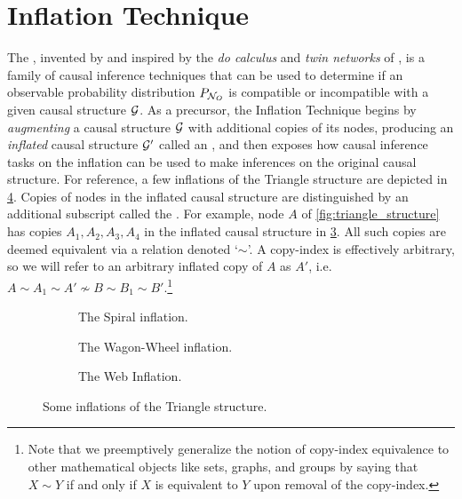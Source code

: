 \documentclass[aps, 10pt, english, twoside, pra, nofootinbib, tightenlines, longbibliography, superscriptaddress]{revtex4-1}
\begin{document}
    \section{Inflation Technique}
    \label{sec:inflation_technique_summary}
    The , invented by \citet{Inflation} and inspired by the \textit{do calculus} and \textit{twin networks} of \citet{Pearl_2009}, is a family of causal inference techniques that can be used to determine if an observable probability distribution $\prob[\nodes_{O}]$ is compatible or incompatible with a given causal structure $\mathcal{G}$. As a precursor, the Inflation Technique begins by \textit{augmenting} a causal structure $\mathcal{G}$ with additional copies of its nodes, producing an \textit{inflated} causal structure $\mathcal{G}'$ called an , and then exposes how causal inference tasks on the inflation can be used to make inferences on the original causal structure. For reference, a few inflations of the Triangle structure are depicted in \cref{fig:inflations}. Copies of nodes in the inflated causal structure are distinguished by an additional subscript called the . For example, node $A$ of \cref{fig:triangle_structure} has copies $A_1, A_2, A_3, A_4$ in the inflated causal structure in \cref{fig:the_web_inflation}. All such copies are deemed equivalent via a  relation denoted `$\sim$'. A copy-index is effectively arbitrary, so we will refer to an arbitrary inflated copy of $A$ as $A'$, i.e. $A \sim A_1 \sim A' \not\sim B \sim B_1 \sim B'$.\footnote{Note that we preemptively generalize the notion of copy-index equivalence to other mathematical objects like sets, graphs, and groups by saying that $X \sim Y$ if and only if $X$ is equivalent to $Y$ upon removal of the copy-index.}

    \begin{nscenter}
    \begin{figure}
    \begin{subfigure}[b]{.30\linewidth}
    \scalebox{0.65}{}
    \caption{The Spiral inflation.}\label{fig:spiral_inflation}
    \end{subfigure}
    \begin{subfigure}[b]{.30\linewidth}
    \scalebox{0.65}{}
    \caption{The Wagon-Wheel inflation.}\label{fig:wagon_wheel_inflation}
    \end{subfigure}
    \begin{subfigure}[b]{.30\linewidth}
    \scalebox{0.65}{}
    \caption{The Web Inflation.}\label{fig:the_web_inflation}
    \end{subfigure}
    \caption{Some inflations of the Triangle structure.}
    \label{fig:inflations}
    \end{figure}
    \end{nscenter}
\end{document}
